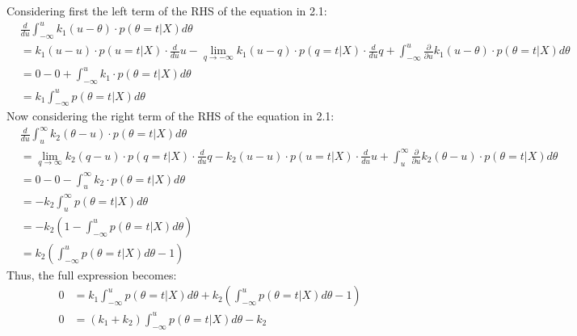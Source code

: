 Considering first the left term of the RHS of the equation in 2.1:
\begin{align*}
    & \frac{d}{du}\int_{-\infty}^{u} k_1(u-\theta)\cdot p(\theta=t|X)d\theta\\
   &= k_1(u-u)\cdot p(u=t|X)\cdot \frac{d}{du}u - \lim_{q\rightarrow-\infty} k_1(u-q)\cdot p(q=t|X)\cdot \frac{d}{du}q + \int_{-\infty}^{u} \frac{\partial}{\partial u} k_1(u-\theta)\cdot p(\theta=t|X)d\theta\\
   &= 0 - 0 + \int_{-\infty}^{u} k_1\cdot p(\theta=t|X) d\theta\\
   &= k_1 \int_{-\infty}^{u} p(\theta=t|X) d\theta
\end{align*}
Now considering the right term of the RHS of the equation in 2.1:
\begin{align*}
    & \frac{d}{du}\int_{u}^{\infty} k_2(\theta-u)\cdot p(\theta=t|X)d\theta\\
   &= \lim_{q\rightarrow\infty} k_2(q-u)\cdot p(q=t|X)\cdot \frac{d}{du}q - k_2(u-u)\cdot p(u=t|X)\cdot \frac{d}{du}u + \int_{u}^{\infty} \frac{\partial}{\partial u} k_2(\theta-u)\cdot p(\theta=t|X)d\theta\\
   &= 0 - 0 - \int_{u}^{\infty} k_2\cdot p(\theta=t|X) d\theta\\
   &= -k_2 \int_{u}^{\infty} p(\theta=t|X) d\theta\\
   &= -k_2 \left(1-\int_{-\infty}^{u} p(\theta=t|X)d\theta\right)\\
   &= k_2 \left(\int_{-\infty}^{u} p(\theta=t|X)d\theta-1\right)
\end{align*}
Thus, the full expression becomes:
\begin{align*}
    0 &= k_1 \int_{-\infty}^{u} p(\theta=t|X) d\theta + k_2 \left(\int_{-\infty}^{u} p(\theta=t|X)d\theta-1\right)\\
    0 &= (k_1 + k_2)\int_{-\infty}^{u} p(\theta=t|X) d\theta - k_2
\end{align*}